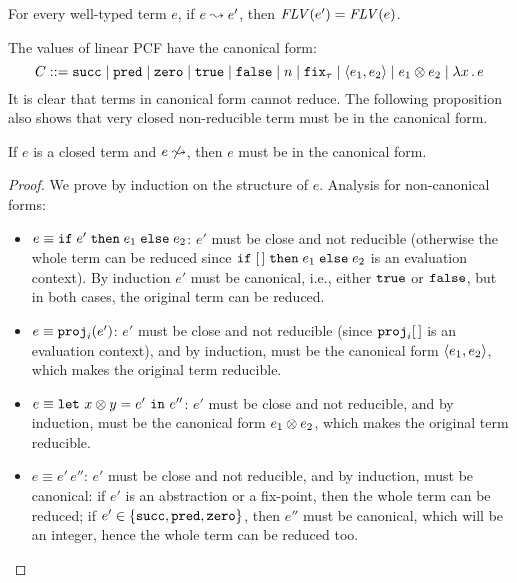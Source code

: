 \documentclass[10pt,a4]{article}
\begin{document}
\begin{lemma}
For every well-typed term $e$, if $e \leadsto e'$, then $\mathit{FLV}(e') = \mathit{FLV}(e)$.
\end{lemma}

The values of linear PCF have the canonical form:
\[
C ::= \mathtt{succ} \mid \mathtt{pred} \mid \mathtt{zero} \mid \mathtt{true} \mid \mathtt{false} \mid n \mid \mathtt{fix}_\tau 
\mid \langle{e_1, e_2}\rangle \mid e_1 \otimes e_2 \mid \lambda x \, . \, e 
\]
It is clear that terms in canonical form cannot reduce. The following proposition also 
shows that very closed non-reducible term must be in the canonical form.

\begin{proposition}
If $e$ is a closed term and $e \not\leadsto$, then $e$ must be in the canonical form.
\end{proposition}
%
\begin{proof}
We prove by induction on the structure of $e$. Analysis for non-canonical forms:
\begin{itemize}
\item $e \equiv \mathtt{if} \; {e'} \; \mathtt{then} \; {e_1} \; \mathtt{else} \; {e_2}$: $e'$ must be close and not reducible (otherwise the whole 
  term can be reduced since $\mathtt{if} \; {[\,]} \; \mathtt{then} \; {e_1} \; \mathtt{else} \; {e_2}$ is an evaluation context). By induction 
  $e'$ must be canonical, i.e., either $\mathtt{true}$ or $\mathtt{false}$, but in both cases, the original 
  term can be reduced.
\item $e \equiv \mathtt{proj}_i(e')$: $e'$ must be close and not reducible (since $\mathtt{proj}_i [\,]$ is 
  an evaluation context), and by induction, must be the canonical form $\langle{e_1, e_2}\rangle$, 
  which makes the original term reducible.
\item $e \equiv \mathtt{let} \ {x \otimes y} = {e'} \ \mathtt{in} \ {e''}$: $e'$ must be close and not reducible, 
  and by induction, must be the canonical form $e_1 \otimes e_2$, which makes the original 
  term reducible.
\item $e \equiv e' \, e''$: $e'$ must be close and not reducible, and by induction, must be 
  canonical: if $e'$ is an abstraction or a fix-point, then the whole term can be reduced; 
  if $e' \in \{{\mathtt{succ}, \mathtt{pred}, \mathtt{zero}}\}$, then $e''$ must be canonical, which will be an 
  integer, hence the whole term can be reduced too.
\end{itemize}
\end{proof}
\end{document}
